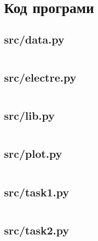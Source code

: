\section{Код програми}
\label{sec:code}

\subsection{src/data.py}
\label{subsec:src/data.py}
\inputminted{python}{../src/data.py}

\subsection{src/electre.py}
\label{subsec:src/electre.py}
\inputminted{python}{../src/electre.py}

\subsection{src/lib.py}
\label{subsec:src/lib.py}
\inputminted{python}{../src/lib.py}

\subsection{src/plot.py}
\label{subsec:src/plot.py}
\inputminted{python}{../src/plot.py}

\subsection{src/task1.py}
\label{subsec:src/task1.py}
\inputminted{python}{../src/task1.py}

\subsection{src/task2.py}
\label{subsec:src/task2.py}
\inputminted{python}{../src/task2.py}
